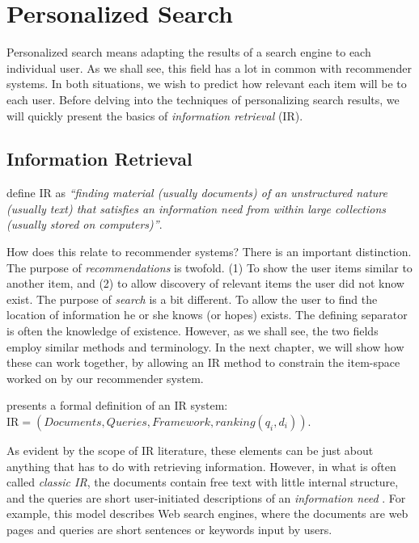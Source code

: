 \section{Personalized Search}
\label{sec:search}

Personalized search means adapting the results of a search engine to each individual user.
As we shall see, this field has a lot in common with recommender systems.
In both situations, we wish to predict how relevant each item will be to each user.
Before delving into the techniques of personalizing search results, we will quickly present 
the basics of \emph{information retrieval} (IR).

\subsection{Information Retrieval}
\label{sec:ir}

\citet[p.1]{Manning2008} define IR as \emph{``finding material (usually documents) of
an unstructured nature (usually text) that satisfies an information need
from within large collections (usually stored on computers)''}.

How does this relate to recommender systems? There is an important distinction.
The purpose of \emph{recommendations} is twofold. (1) To show the user items
similar to another item, and (2) to allow discovery of relevant items the user did not know exist.
The purpose of \emph{search} is a bit different. To allow the user to find the location of
information he or she knows (or hopes) exists.
The defining separator is often the knowledge of existence.
However, as we shall see, the two fields employ similar methods and terminology. 
In the next chapter, we will show how these can work together,
by allowing an IR method to constrain the item-space worked on by our recommender system.

\citet[p.23]{Baeza-Yates1999} presents a formal definition of an IR system:
$\mathrm{IR} = (Documents, Queries, Framework, ranking(q_i, d_i))$.

As evident by the scope of IR literature, these elements can be just about anything
that has to do with retrieving information. However, in what is often called
\emph{classic IR}, the documents contain free text with little internal structure,
and the queries are short user-initiated descriptions of an \emph{information need} \citep[p.19]{Baeza-Yates1999}. 
For example, this model describes Web search engines, where the documents are web pages and
queries are short sentences or keywords input by users.

